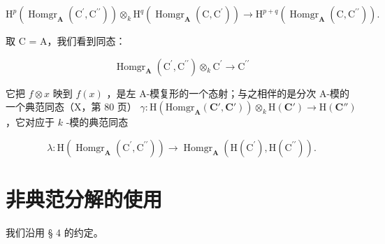 \[
\mathrm{H} ^ {p} \left(\operatorname{Homgr} _ {\mathbf {A}} \left(\mathrm{C} ^ {\prime}, \mathrm{C} ^ {\prime \prime}\right)\right) \otimes_ {k} \mathrm{H} ^ {q} \left(\operatorname{Homgr} _ {\mathbf {A}} \left(\mathrm{C}, \mathrm{C} ^ {\prime}\right)\right)\rightarrow \mathrm{H} ^ {p + q} \left(\operatorname{Homgr} _ {\mathbf {A}} \left(\mathrm{C}, \mathrm{C} ^ {\prime \prime}\right)\right). \tag {17}
\]

取 C = A，我们看到同态：

\[
\operatorname{Homgr} _ {\mathbf {A}} \left(\mathrm{C} ^ {\prime}, \mathrm{C} ^ {\prime \prime}\right) \otimes_ {k} \mathrm{C} ^ {\prime} \rightarrow \mathrm{C} ^ {\prime \prime}\tag{18}
\]

它把 \(f \otimes x\) 映到 \(f(x)\) ，是左 A-模复形的一个态射；与之相伴的是分次 A-模的一个典范同态（X，第 80 页） \(\gamma : \mathrm{H}(\mathrm{Homgr}_{\mathbf{A}}(\mathbf{C}', \mathbf{C}')) \otimes_k \mathrm{H}(\mathbf{C}') \to \mathrm{H}(\mathbf{C}'')\) ，它对应于 \(k\) -模的典范同态

\[
\lambda : \mathrm{H} (\operatorname{Homgr} _ {\mathbf {A}} \left(\mathrm{C} ^ {\prime}, \mathrm{C} ^ {\prime \prime}\right)) \rightarrow \operatorname{Homgr} _ {\mathbf {A}} \left(\mathrm{H} (\mathrm{C} ^ {\prime}), \mathrm{H} (\mathrm{C} ^ {\prime \prime})\right).
\]

\section{非典范分解的使用}

我们沿用 § 4 的约定。
